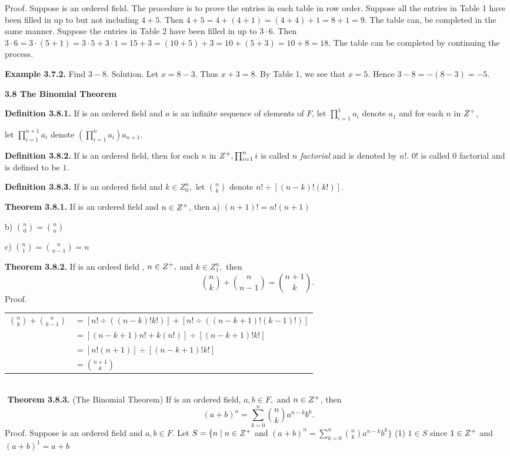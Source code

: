 \begin{large}
\begin{center}
\end{center}

Proof. Suppose \of is an ordered field. The procedure is to prove the entries in each table in row order. Suppose all the entries in Table 1 have been filled in up to but not including $4 + 5.$ Then
$4 + 5 = 4 +(4+1) = (4+4) + 1 = 8 + 1 = 9.$ The table can, be completed in the same manner. \nl
Suppose the entries in Table 2 have been filled in up to $3\cdot 6.$ Then\nl
$3\cdot 6 =3\cdot(5+1) =3\cdot 5 + 3\cdot 1 = 15 + 3 = (10 + 5) + 3 = 10 + (5+3)= 10 + 8 = 18.$ \nl
The table can be completed by continuing the process. \nl

\textbf{Example 3.7.2.} Find $3 - 8.$ \nl
Solution. Let $x = 8 -3.$ Thus $x + 3 = 8.$ By Table 1, we see that $x = 5.$ Hence $3 - 8 = -(8-3) = -5.$\nl

\vfill
\textbf{3.8 The Binomial Theorem}
\nl

\textbf{Definition 3.8.1.} If \of  is an ordered field and $a$ is an infinite
sequence of elements of $F$, let $\prod_{i=1}^{1}a_{i}$ denote $a_{1}$ and for each $n$ in $Z^{+}$,   \nl

\newpage

let $\prod_{i=1}^{n+1} a_{i} $ denote $\left(\prod_{i=1}^{n}a_{i}\right)a_{n+1} .$ \nl

\textbf{Definition 3.8.2.} If \of is an ordered field, then for each $n$ in $Z^{+}, \prod_{i=1}^{n} i $ is called $n$ \textit{factorial} and is denoted by $n!.$  $0!$ is called $0$ factorial and is defined to be $1$. \nl

\textbf{Definition 3.8.3.} If \of is an ordered field and $k \in Z_{0}^{n},$ let $\binom{n}{k} $ denote
$n!\div[(n-k)!(k!)].$\nl

\textbf{Theorem 3.8.1.}  If \of is an ordered field and $n\in Z^{+}$, then\nl
a) $(n+1)! = n!(n+1) $\nl

b) $\binom{n}{0} = \binom{n}{n}$\nl

c) $\binom{n}{1} = \binom{n}{n-1} = n$\nl

\textbf{Theorem 3.8.2.}  If \of is an ordeed field , $n \in Z^{+},$ and $k\in Z_{1}^{n},$ then\nl
\[
\binom{n}{k} + \binom{n}{n-1} = \binom{n+1}{k}.
\]
Proof.\nl
\begin{tabular}{r l}
$\binom{n}{k}+\binom{n}{k-1}$&$=[n!\div((n-k)!k!)] + [n!\div((n-k+1)!(k-1)!)]$\\
&$=[(n-k+1)n! +k(n!)]\div[(n-k+1)!k!]$\\
&$=[n!(n+1)]\div[(n-k+1)!k!]$\\
&$=\binom{n+1}{k}$\\
\end{tabular}\\
$ $\nl
\textbf{Theorem 3.8.3.}  (The Binomial Theorem)  If \of is an ordered field, $a, b \in F,$ and $n\in Z^{+}$, then
\[
\ (a + b)^{n} = \sum_{k=0}^{n}\binom{n}{k}a^{n-k}b^{k}.
\]
Proof.  Suppose \of is an ordered field and $a,b\in F.$\nl
Let $S = \{ n \mid n\in Z^{+} $ and  $(a + b)^{n} = \sum_{k=0}^{n}\binom{n}{k}a^{n-k}b^{k} \}$\nl
(1) $1\in S$ since $1\in Z^{+}$ and $(a+b)^{1} = a + b$\nl


\end{large}
